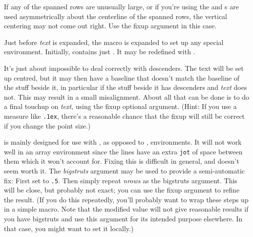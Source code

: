 \documentclass[a4paper]{article}
\begin{document}
If any of the spanned rows are unusually large, or if you're using the
 and s are used asymmetrically about the
centerline of the spanned rows, the vertical centering may not come
out right.  Use the fixup argument in this case.

Just before \emph{text} is expanded, the  macro is
expanded to set up any special environment.  Initially,
 contains just .  It may be
redefined with .

It's just about impossible to deal correctly with descenders.  The
text will be set up centred, but it may then have a baseline that
doesn't match the baseline of the stuff beside it, in particular if
the stuff beside it has descenders and \emph{text} does not.  This may
result in a small misalignment.  About all that can be done is to do a
final touchup on \emph{text}, using the fixup optional argument.
(Hint:  If you use a measure like \texttt{.1ex}, there's a reasonable
chance that the fixup will still be correct if you change the point
size.)

 is mainly designed for use with , as
opposed to , environments.  It will not work well in an
array environment since the lines have an extra \texttt{jot} of space
between them which it won't account for.  Fixing this is difficult in
general, and doesn't seem worth it.  The \emph{bigstruts} argument may
be used to provide a semi-automatic fix: First set  to
\texttt{.5}.  Then simply repeat \emph{nrows} as the bigstruts
argument.  This will be close, but probably not exact; you can use the
fixup argument to refine the result.  (If you do this repeatedly,
you'll probably want to wrap these steps up in a simple macro.  Note
that the modified  value will not give reasonable
results if you have bigstruts and use this argument for its intended
purpose elsewhere.  In that case, you might want to set it locally.)
\end{document}
